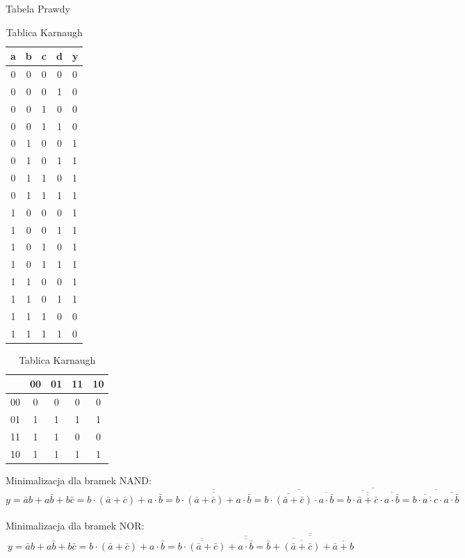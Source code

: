 \documentclass[12pt,a4paper]{report}
\begin{document}
	\begin{table}[h]
		\begin{minipage}{0.5\linewidth}
			\caption{Tabela Prawdy}
			\centering
			\begin{tabular}{cccc|l}
				a&b&c&d&y\\\hline
				0&0&0&0&0\\
				0&0&0&1&0\\
				0&0&1&0&0\\
				0&0&1&1&0\\\hline
				0&1&0&0&1\\
				0&1&0&1&1\\
				0&1&1&0&1\\
				0&1&1&1&1\\\hline
				1&0&0&0&1\\
				1&0&0&1&1\\
				1&0&1&0&1\\
				1&0&1&1&1\\\hline
				1&1&0&0&1\\
				1&1&0&1&1\\
				1&1&1&0&0\\
				1&1&1&1&0\\
			\end{tabular}
		\end{minipage}%
	
		\begin{minipage}{.5\linewidth}
			\caption{Tablica Karnaugh}
			\centering
			\begin{tabular}{c|c|c|c|c}
				\backslashbox{ab}{cd}&00&01&11&10\\\hline
				       00&0 &0 & 0&0\\\hline
					   01&1 &1 & 1&1\\\hline
					   11&1 &1 & 0&0\\\hline
					   10&1 &1 & 1&1\\
			\end{tabular}
		\end{minipage} 
	\end{table}

	
	Minimalizacja dla bramek NAND:
	\begin{displaymath}
	y=\bar{a}b+a\bar{b}+b\bar{c}
	=b\cdot(\bar{a}+\bar{c})+a\cdot\bar{b}
	=\overline{\overline{b\cdot(\bar{a}+\bar{c})+a\cdot\bar{b}}}
	=\overline{\overline{b\cdot(\bar{a}+\bar{c})}\cdot\overline{a\cdot\bar{b}}}
	=\overline{\overline{b\cdot\overline{\overline{\bar{a}+\bar{c}}}}\cdot\overline{a\cdot\bar{b}}}
	=\overline{\overline{b\cdot\overline{a\cdot c}}\cdot\overline{a\cdot\bar{b}}}
	\end{displaymath}
	\\
	Minimalizacja dla bramek NOR:
	\begin{displaymath}
	y=\bar{a}b+a\bar{b}+b\bar{c}
	=b\cdot(\bar{a}+\bar{c})+a\cdot\bar{b}
	=\overline{\overline{b\cdot(\bar{a}+\bar{c})}}+\overline{\overline{a\cdot\bar{b}}}
	=\overline{\overline{\overline{\bar{b}+\overline{(\bar{a}+\bar{c})}}+\overline{\bar{a}+b}}}
	\end{displaymath}
	
\end{document}

